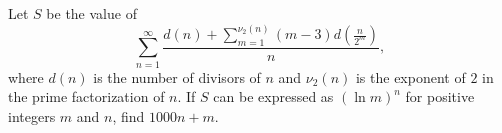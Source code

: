 Let $S$ be the value of
\[\sum_{n=1}^\infty \frac{d(n) + \sum_{m=1}^{\nu_2(n)}(m-3)d\left(\frac{n}{2^m}\right)}{n},\]
where $d(n)$ is the number of divisors of $n$ and $\nu_2(n)$ is the exponent of $2$ in the prime factorization of $n$. If $S$ can be expressed as $(\ln m)^n$ for positive integers $m$ and $n$, find $1000n + m$.
